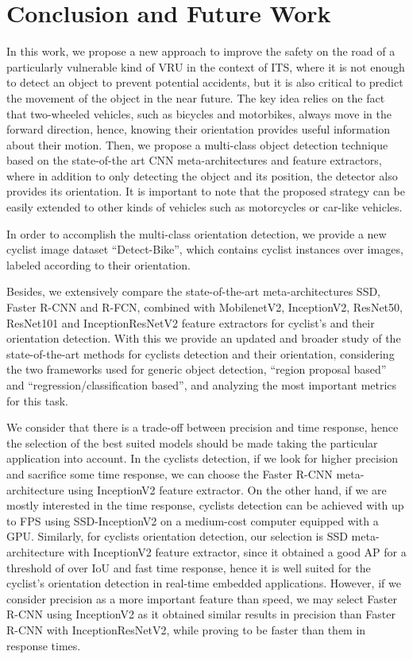 \documentclass[journal]{IEEEtran}
\begin{document}
\section{Conclusion and Future Work}
\label{sec:Conclusion}

In this work, we propose a new approach to improve the safety on the road of a particularly vulnerable kind of VRU in the context of ITS, where it is not enough to detect an object to prevent potential accidents, but it is also critical to predict the movement of the object in the near future. The key idea relies on the fact that two-wheeled vehicles, such as bicycles and motorbikes, always move in the forward direction, hence, knowing their orientation provides useful information about their motion. Then, we propose a multi-class object detection technique based on the state-of-the art CNN meta-architectures and feature extractors, where in addition to only detecting the object and its position, the detector also provides its orientation. It is important to note that the proposed strategy can be easily extended to other kinds of vehicles such as motorcycles or car-like vehicles.

In order to accomplish the multi-class orientation detection, we provide a new cyclist image dataset ``Detect-Bike'', which contains  cyclist instances over  images, labeled according to their orientation. 

Besides, we extensively compare the state-of-the-art meta-architectures SSD, Faster R-CNN and R-FCN, combined with MobilenetV2, InceptionV2, ResNet50, ResNet101 and InceptionResNetV2 feature extractors for cyclist's and their orientation detection. With this we provide an updated and broader study of the state-of-the-art methods for cyclists detection and their orientation, considering the two frameworks used for generic object detection, ``region proposal based'' and ``regression/classification based'', and analyzing the most important metrics for this task.

We consider that there is a trade-off between precision and time response, hence the selection of the best suited models should be made taking the particular application into account. In the cyclists detection, if we look for higher precision and sacrifice some time response, we can choose the Faster R-CNN meta-architecture using InceptionV2 feature extractor. On the other hand, if we are mostly interested in the time response, cyclists detection can be achieved with up to  FPS using SSD-InceptionV2 on a medium-cost computer equipped with a GPU. Similarly, for cyclists orientation detection, our selection is SSD meta-architecture with InceptionV2 feature extractor, since it obtained a good AP for a threshold of  over IoU and fast time response, hence it is well suited for the cyclist's orientation detection in real-time embedded applications. However, if we consider precision as a more important feature than speed, we may select Faster R-CNN using InceptionV2 as it obtained similar results in precision than Faster R-CNN with InceptionResNetV2, while proving to be faster than them in response times.
 
\end{document}
